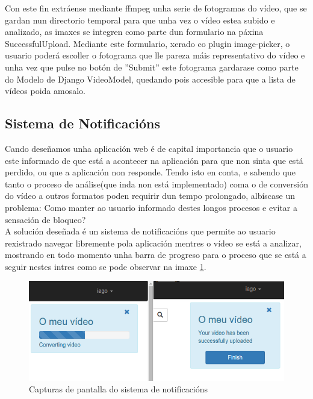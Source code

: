         Con este fin extráense mediante ffmpeg unha serie de fotogramas do vídeo, que se gardan nun
        directorio temporal para que unha vez o vídeo estea subido e analizado, as imaxes se integren 
        como parte dun formulario na páxina SuccessfulUpload. Mediante este formulario, xerado co plugin
        image-picker\cite{ImagePickerPage}, o usuario poderá escoller o fotograma que lle pareza máis
        representativo do vídeo e unha vez que pulse no botón de ''Submit'' este fotograma gardarase
        como parte do Modelo de Django VideoModel, quedando pois accesible para que a lista de vídeos 
        poida amosalo.
        
    \subsection{Sistema de Notificacións}
    \label{sec:notificacions}
        Cando deseñamos unha aplicación web é de capital importancia que o usuario este informado de que está
        a acontecer na aplicación para que non sinta que está perdido, ou que a aplicación non responde. Tendo
        isto en conta, e sabendo que tanto o proceso de análise(que inda non está implementado)
        coma o de conversión do vídeo a outros formatos poden requirir dun tempo prolongado, 
        albíscase un problema: Como manter ao usuario informado destes longos procesos e evitar a
        sensación de bloqueo?\\
        
        A solución deseñada é un sistema de notificacións que permite ao usuario rexistrado navegar libremente
        pola aplicación mentres o vídeo se está a analizar, mostrando en todo momento unha barra de progreso
        para o proceso que se está a seguir nestes intres como se pode observar na imaxe 
        \ref{fig:Notificacions}.
        
        \begin{figure}[htp]
        \begin{center}
            \includegraphics[scale=0.5]{figures/Notificacions.png}
            \caption{Capturas de pantalla do sistema de notificacións}
        \label{fig:Notificacions}
        \end{center}
        \end{figure}
        
